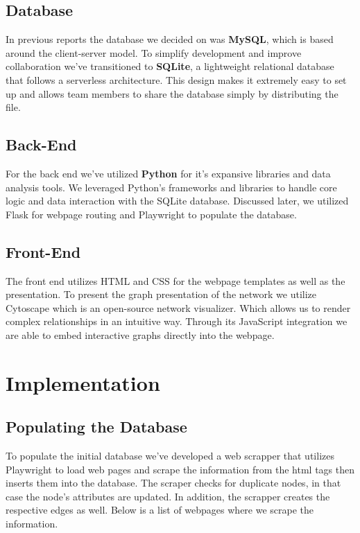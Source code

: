 \documentclass[sigconf]{acmart}
\begin{document}
\subsection{Database}
In previous reports the database we decided on was \textbf{MySQL}, which is based around the client-server model. To simplify development and improve collaboration we've transitioned to \textbf{SQLite}, a lightweight relational database that follows a serverless architecture. This design makes it extremely easy to set up and allows team members to share the database simply by distributing the file.
\subsection{Back-End}
For the back end we've utilized \textbf{Python} for it's expansive libraries and data analysis tools. We leveraged Python’s frameworks and libraries to handle core logic and data interaction with the SQLite database. Discussed later, we utilized Flask for webpage routing and Playwright to populate the database.
\subsection{Front-End}
The front end utilizes HTML and CSS for the webpage templates as well as the presentation. To present the graph presentation of the network we utilize Cytoscape which is an open-source network visualizer. Which allows us to render complex relationships in an intuitive way. Through its JavaScript integration we are able to embed interactive graphs directly into the webpage.

\section{Implementation}
\subsection{Populating the Database}
To populate the initial database we've developed a web scrapper that utilizes Playwright to load web pages and scrape the information from the html tags then inserts them into the database. The scraper checks for duplicate nodes, in that case the node's attributes are updated. In addition, the scrapper creates the respective edges as well. Below is a list of webpages where we scrape the information.
\end{document}
